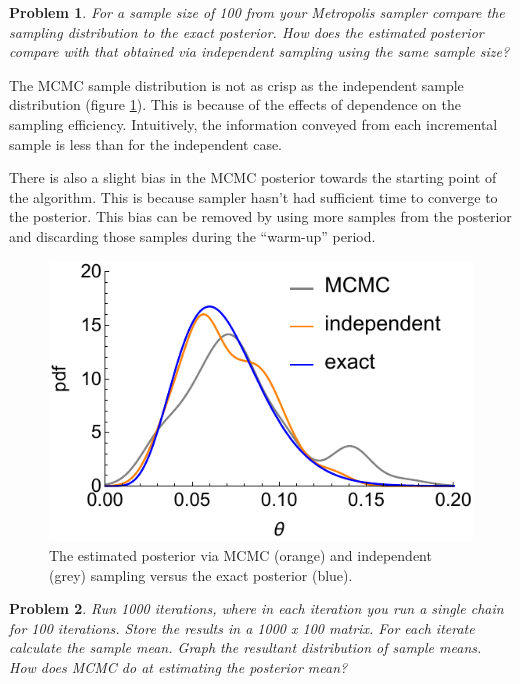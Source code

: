 \documentclass{article}
\newtheorem{problem}{Problem}[section]
\begin{document}
\begin{problem}
For a sample size of 100 from your Metropolis sampler compare the sampling distribution to the exact posterior. How does the estimated posterior compare with that obtained via independent sampling using the same sample size?
\end{problem}

The MCMC sample distribution is not as crisp as the independent sample distribution (figure \ref{fig:ticks_independentMCMCIndependentExact}). This is because of the effects of dependence on the sampling efficiency. Intuitively, the information conveyed from each incremental sample is less than for the independent case. 

There is also a slight bias in the MCMC posterior towards the starting point of the algorithm. This is because sampler hasn't had sufficient time to converge to the posterior. This bias can be removed by using more samples from the posterior and discarding those samples during the ``warm-up'' period.

\begin{figure}[ht]
\centerline{\includegraphics[width=1\textwidth]{../figures/prob3_ticksMCMCIndependentExact.pdf}}
\caption{The estimated posterior via MCMC (orange) and independent (grey) sampling versus the exact posterior (blue).}\label{fig:ticks_independentMCMCIndependentExact}
\end{figure}

\begin{problem}
Run 1000 iterations, where in each iteration you run a single chain for 100 iterations. Store the results in a 1000 x 100 matrix. For each iterate calculate the sample mean. Graph the resultant distribution of sample means. How does MCMC do at estimating the posterior mean?
\end{problem}
\end{document}
